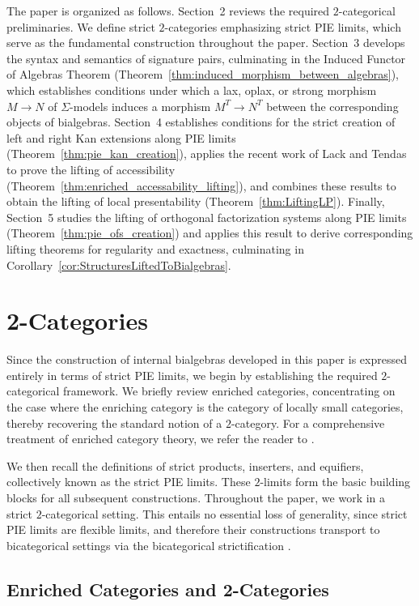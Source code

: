 \documentclass[11pt]{article}
\theoremstyle{plain}
\theoremstyle{definition}
\numberwithin{equation}{section}
\begin{document}
The paper is organized as follows. Section~2 reviews the required $2$-categorical preliminaries. We define strict $2$-categories emphasizing strict PIE limits, which serve as the fundamental construction throughout the paper. Section~3 develops the syntax and semantics of signature pairs, culminating in the Induced Functor of Algebras Theorem (Theorem~\ref{thm:induced_morphism_between_algebras}), which establishes conditions under which a lax, oplax, or strong morphism $M\to N$ of $\Sigma$-models induces a morphism $M^T\to N^T$ between the corresponding objects of bialgebras. Section~4 establishes conditions for the strict creation of left and right Kan extensions along PIE limits (Theorem~\ref{thm:pie_kan_creation}), applies the recent work of Lack and Tendas to prove the lifting of accessibility (Theorem~\ref{thm:enriched_accessability_lifting}), and combines these results to obtain the lifting of local presentability (Theorem~\ref{thm:LiftingLP}). Finally, Section~5 studies the lifting of orthogonal factorization systems along PIE limits (Theorem~\ref{thm:pie_ofs_creation}) and applies this result to derive corresponding lifting theorems for regularity and exactness, culminating in Corollary~\ref{cor:StructuresLiftedToBialgebras}.

\section{2-Categories}
Since the construction of internal bialgebras developed in this paper is expressed entirely in terms of strict PIE limits, we begin by establishing the required $2$-categorical framework. We briefly review enriched categories, concentrating on the case where the enriching category is the category of locally small categories, thereby recovering the standard notion of a $2$-category. For a comprehensive treatment of enriched category theory, we refer the reader to \cite{Kelly:Enriched}.

We then recall the definitions of strict products, inserters, and equifiers, collectively known as the strict PIE limits. These $2$-limits form the basic building blocks for all subsequent constructions. Throughout the paper, we work in a strict $2$-categorical setting. This entails no essential loss of generality, since strict PIE limits are flexible limits, and therefore their constructions transport to bicategorical settings via the bicategorical strictification \cite{PowerPIE1991, GordonPowerStreet1995CoherenceTricategories}. 

\subsection{Enriched Categories and 2-Categories}
\end{document}
